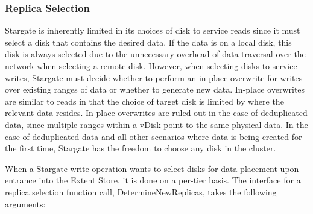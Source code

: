 \documentclass[12pt]{article}
\begin{document}
    \subsubsection{Replica Selection}

    Stargate is inherently limited in its choices of disk to service reads
    since it must select a disk that contains the desired data. If the data is
    on a local disk, this disk is always selected due to the unnecessary
    overhead of data traversal over the network when selecting a remote disk.
    However, when selecting disks to service writes, Stargate must decide
    whether to perform an in-place overwrite for writes over existing ranges of
    data or whether to generate new data. In-place overwrites are similar to
    reads in that the choice of target disk is limited by where the relevant
    data resides. In-place overwrites are ruled out in the case of deduplicated
    data, since multiple ranges within a vDisk point to the same physical data.
    In the case of deduplicated data and all other scenarios where data is
    being created for the first time, Stargate has the freedom to choose any
    disk in the cluster.

    When a Stargate write operation wants to select disks for data placement
    upon entrance into the Extent Store, it is done on a per-tier basis. The
    interface for a replica selection function call, DetermineNewReplicas,
    takes the following arguments:
\end{document}
